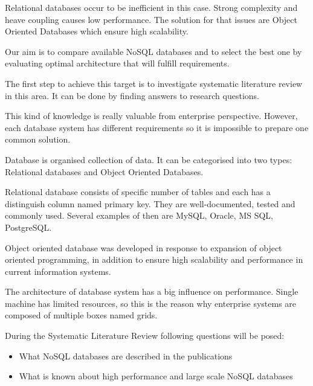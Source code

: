 \documentclass[times, 10pt,twocolumn]{article}
\begin{document}
Relational databases occur to be inefficient in this case. Strong complexity and
heave coupling causes low performance. The solution for that issues are Object Oriented
Databases which ensure high scalability.

Our aim is to compare available NoSQL databases and to select the best one by evaluating 
optimal architecture that will fulfill requirements. 

The first step to achieve this target is to investigate systematic literature review in this area.
It can be done by finding answers to research questions.

This kind of knowledge is really valuable from enterprise perspective. However, each database
system has different requirements so it is impossible to prepare one common solution. 
 

Database is organised collection of data. It can be categorised into two types: 
Relational databases and Object Oriented Databases.

Relational database consists of specific number of tables and each has a distinguish column named primary key. 
They are well-documented, tested and commonly used. Several examples of then are MySQL, Oracle, MS SQL, PostgreSQL. 

Object oriented database was developed in response to expansion of object oriented programming, in addition to ensure high scalability and  
performance in current information systems.

The architecture of database system has a big influence on performance. Single machine has limited
resources, so this is the reason why enterprise systems are composed of multiple boxes named grids.


During the Systematic Literature Review following questions will be posed: 

\begin{itemize}
  \item What NoSQL databases are described in the publications
  \item What is known about high performance and large scale NoSQL databases   
\end{itemize}
\end{document}
